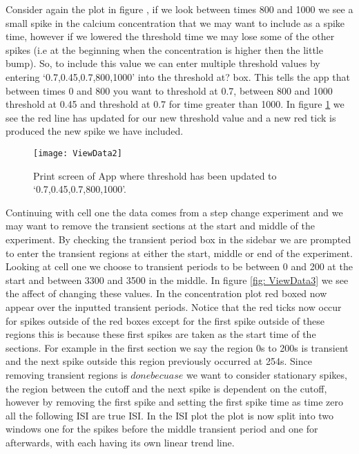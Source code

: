 \documentclass[../main.tex]{subfiles}
\begin{document}
Consider again the plot in figure \cite{fig: ViewData}, if we look between times 800 and 1000 we see a small spike in the calcium concentration that we may want to include as a spike time, however if we lowered the threshold time we may lose some of the other spikes (i.e at the beginning when the concentration is higher then the little bump). So, to include this value we can enter multiple threshold values by entering `0.7,0.45,0.7,800,1000' into the threshold at? box. This tells the app that between times 0 and 800 you want to threshold at 0.7, between 800 and 1000 threshold at 0.45 and threshold at 0.7 for time greater than 1000. In figure \ref{fig: ViewData2} we see the red line has updated for our new threshold value and a new red tick is produced the new spike we have included.  

\begin{figure}[t]
	\texttt{[image: ViewData2]}
	\caption{Print screen of App where threshold has been updated to `0.7,0.45,0.7,800,1000'.}
	\label{fig: ViewData2}
\end{figure}


Continuing with cell one the data comes from a step change experiment and we may want to remove the transient sections at the start and middle of the experiment. By checking the transient period box in the sidebar we are prompted to enter the transient regions at either the start, middle or end of the experiment. Looking at cell one we choose to transient periods to be between 0 and 200 at the start and between 3300 and 3500 in the middle. In figure \ref{fig: ViewData3} we see the affect of changing these values. In the concentration plot red boxed now appear over the inputted transient periods. Notice that the red ticks now occur for spikes outside of the red boxes except for the first spike outside of these regions this is because these first spikes are taken as the start time of the sections. For example in the first section we say the region 0s to 200s is transient and the next spike outside this region previously occurred at 254s. Since removing transient regions is $done becuase$ we want to consider stationary spikes, the region between the cutoff and the next spike is dependent on the cutoff, however by removing the first spike and setting the first spike time as time zero all the following ISI are true ISI. In the ISI plot the plot is now split into two windows one for the spikes before the middle transient period and one for afterwards, with each having its own linear trend line. 
\end{document}
